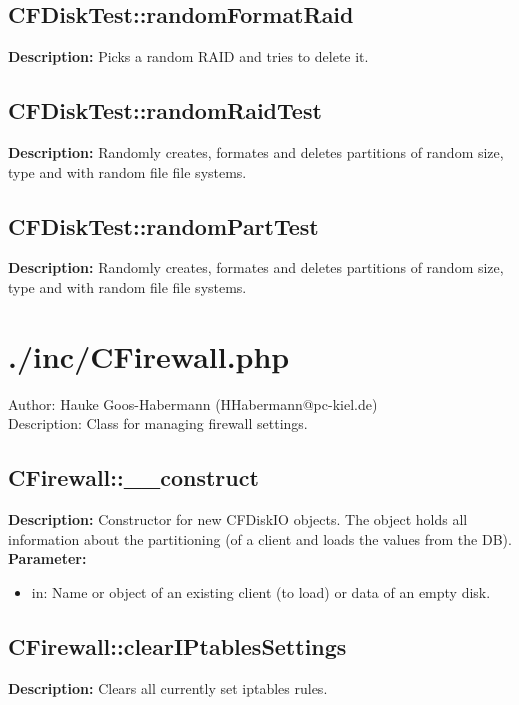 \subsection{CFDiskTest::randomFormatRaid}
\textbf{Description:} Picks a random RAID and tries to delete it.\\

\subsection{CFDiskTest::randomRaidTest}
\textbf{Description:} Randomly creates, formates and deletes partitions of random size, type and with random file file systems.\\

\subsection{CFDiskTest::randomPartTest}
\textbf{Description:} Randomly creates, formates and deletes partitions of random size, type and with random file file systems.\\

\newpage\section{./inc/CFirewall.php}
 Author: Hauke Goos-Habermann (HHabermann@pc-kiel.de)\\
 Description: Class for managing firewall settings.\\

\subsection{CFirewall::\_\_construct}
\textbf{Description:} Constructor for new CFDiskIO objects. The object holds all information about the partitioning (of a client and loads the values from the DB).\\
\textbf{Parameter:}
\begin{itemize}
\item in: Name or object of an existing client (to load) or data of an empty disk.
\end{itemize}

\subsection{CFirewall::clearIPtablesSettings}
\textbf{Description:} Clears all currently set iptables rules.\\

